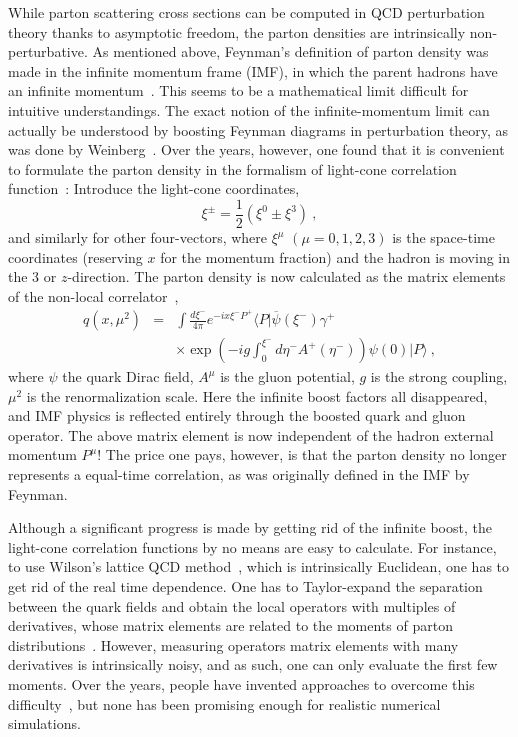 While parton scattering cross sections can be computed in QCD perturbation theory
thanks to asymptotic freedom, the parton densities are intrinsically non-perturbative.
As mentioned above, Feynman's definition of parton density was made in the infinite momentum frame (IMF), in which
the parent hadrons have an infinite momentum~\cite{Feynman:1969ej}. This seems to be a mathematical limit difficult
for intuitive understandings. The exact notion of the infinite-momentum limit can actually be understood by
boosting Feynman diagrams in perturbation theory, as was done by Weinberg~\cite{Weinberg:1966jm}. Over the years,
however, one found that it is convenient to formulate the parton
density in the formalism of light-cone correlation function~\cite{Drell:1969ca}: Introduce the light-cone
coordinates,
\begin{equation}
      \xi^\pm = \frac{1}{2}(\xi^0\pm \xi^3) \ ,
\end{equation}
and similarly for other four-vectors, where $\xi^\mu$ $(\mu=0,1,2,3)$ is the space-time coordinates
(reserving $x$ for the momentum fraction) and the hadron
is moving in the 3 or $z$-direction. The parton density is now calculated as the matrix elements
of the non-local correlator~\cite{Collins:1981uw},
\begin{eqnarray}
   q(x, \mu^2) &=& \int \frac{d\xi^-}{4\pi} e^{-ix\xi^-P^+}  \langle P|\overline{\psi}(\xi^-)
   \gamma^+ \\
   && \times \exp\left(-ig\int^{\xi^-}_0 d\eta^- A^+(\eta^-) \right)\psi(0) |P\rangle \nonumber \ ,
\end{eqnarray}
where $\psi$ the quark Dirac field, $A^\mu$ is the gluon potential,
$g$ is the strong coupling, $\mu^2$ is the renormalization scale.
Here the infinite boost factors all disappeared, and IMF physics is reflected entirely through
the boosted quark and gluon operator. The above matrix element is now independent of the hadron
external momentum $P^\mu$! The price one pays,
however, is that the parton density no longer represents a equal-time correlation, as
was originally defined in the IMF by Feynman.

Although a significant progress is made by getting rid of the infinite boost, the
light-cone correlation functions by no means are easy to calculate. For instance, to use Wilson's
lattice QCD method~\cite{Wilson:1974sk}, which is intrinsically Euclidean, one has to get rid of the real
time dependence. One has to
Taylor-expand the separation between the quark fields and obtain the local operators with multiples
of derivatives, whose matrix elements are related to the moments of parton distributions~\cite{negele}. However, measuring
operators matrix elements with many derivatives is intrinsically noisy, and as such, one can only evaluate
the first few moments. Over the years, people have invented approaches to overcome
this difficulty~\cite{Aglietti:1998mz,Liu:1999ak,Detmold:2005gg}, but
none has been promising enough for realistic numerical simulations.

